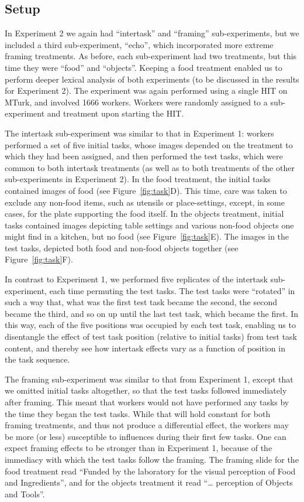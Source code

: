 \documentclass{sigchi}
\begin{document}
\subsection{Setup}
In Experiment 2 we again had ``intertask'' and ``framing'' 
sub-experiments, but we included a third sub-experiment, ``echo'', which 
incorporated more extreme framing treatments.  
As before, each sub-experiment had
two treatments, but this time they were ``food'' and ``objects''.
Keeping a food treatment enabled us to perform deeper lexical analysis of 
both experiments (to be discussed in the results for Experiment 2).  
The experiment was again performed using a single HIT on MTurk, 
and involved 1666 workers.
Workers were randomly assigned to a sub-experiment and treatment upon
starting the HIT.

The intertask sub-experiment was similar to that in Experiment 1: workers
performed a set of five initial tasks, whose images depended on the 
treatment to which they had been assigned, and then performed the test 
tasks, which were common to both intertask treatments (as well as to both 
treatments of the other sub-experiments in Experiment 2).  
In the food treatment, 
the initial tasks contained images of food (see Figure~\ref{fig:task}D).  
This time, care was taken to exclude any non-food items, 
such as utensils or place-settings, except, in some cases, for the plate
supporting the food itself.  In the objects treatment, initial tasks 
contained images depicting table settings and various non-food objects one 
might find in a kitchen, but no food (see Figure~\ref{fig:task}E).  
The images in the test tasks,
depicted both food and non-food objects together 
(see Figure~\ref{fig:task}F).

In contrast to Experiment 1, we performed five replicates of the intertask
sub-experiment, each time permuting the test tasks.  The test tasks were
``rotated'' in such a way that, what was the first test task became
the second, the second became the third, and so on up until the last test
task, which became the first.  In this way, each of the five positions
was occupied by each test task, enabling us to disentangle the effect of
test task position (relative to initial tasks) from test task content,
and thereby see how intertask effects vary as a function of position in
the task sequence.

The framing sub-experiment was similar to that from Experiment 1, except
that we omitted initial tasks altogether, so that the test tasks followed
immediately after framing.  This meant that workers would not have 
performed any tasks by the time they began the test tasks.  While that will
hold constant for both framing treatments, and thus not produce a 
differential effect, the workers may be more (or less) susceptible to 
influences during their first few tasks.  One can expect framing effects
to be stronger than in Experiment 1, because of the immediacy with which
the test tasks follow the framing.  The framing slide for the food 
treatment read ``Funded by the laboratory for the visual perception of 
Food and Ingredients'', and for the objects treatment it read ``\ldots
perception of Objects and Tools''.
\end{document}
